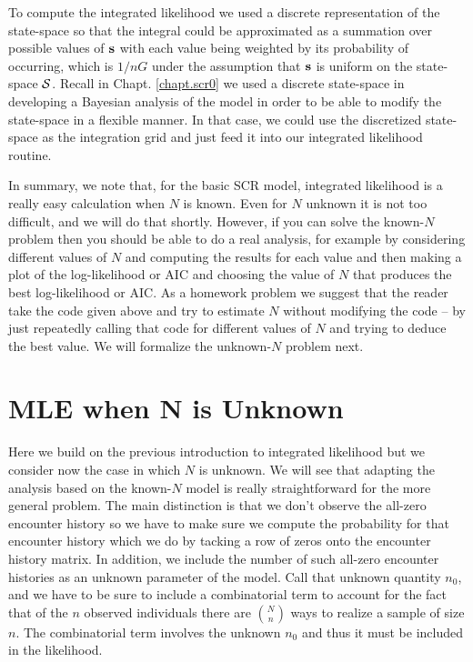 To compute the integrated likelihood we used a discrete representation
of the state-space so that the integral could be approximated as a
summation over possible values of ${\bf s}$ with each value being
weighted by its probability of occurring, which is $1/nG$ under the
assumption that ${\bf s}$ is uniform on the state-space ${\cal
  S}$. Recall
in Chapt. \ref{chapt.scr0} we 
used a discrete state-space in developing a Bayesian analysis of the
model in order to be able to modify the state-space in a flexible
manner. In that case, we could use the discretized state-space as the
integration grid and just feed it into our integrated likelihood
routine. 

In summary, we note that, for the basic SCR model, integrated
likelihood is a really easy calculation when $N$ is known. Even for $N$
unknown it is not too difficult, and we will do that shortly.
However, if you can solve the known-$N$ problem then you should be able
to do a real analysis, for example by considering different values of
$N$ and computing the results for each value and then making a plot of
the log-likelihood or AIC and choosing the value of $N$ that produces
the best log-likelihood or AIC. As a homework problem we suggest that
the reader take the code given above and try to estimate $N$ without
modifying the code – by just repeatedly calling that code for
different values of $N$ and trying to deduce the best value.
We will formalize the unknown-$N$ problem next.



\section{MLE when N is Unknown} 

Here we build on the previous introduction to integrated likelihood
but we consider now the case in which $N$ is unknown. We will see that
adapting the analysis based on the known-$N$ model is really
straightforward for the more general problem. The main distinction is
that we don’t observe the all-zero encounter history so we have to
make sure we compute the probability for that encounter history which
we do by tacking a row of zeros onto the encounter history matrix. In
addition, we include the number of such all-zero encounter histories
as an unknown parameter of the model. Call that unknown quantity
$n_{0}$, and we have to 
be sure to include a combinatorial term to
account for the fact that of the $n$ observed individuals there are
${N \choose n}$
 ways to realize a sample of size $n$. The combinatorial term
involves the unknown $n_{0}$ and thus it must be included in the likelihood.

